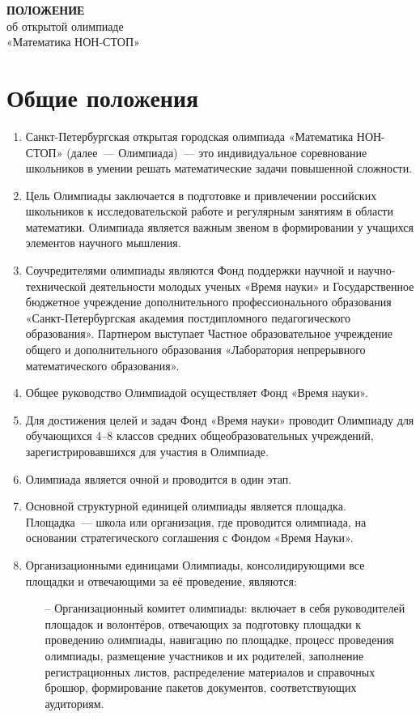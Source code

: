 \documentclass[a4paper,12pt]{article}
\newcommand{\mns}{«Математика НОН-СТОП»\xspace}
\begin{document}


\begin{center} \Large
	{\bf ПОЛОЖЕНИЕ} \\
	об открытой олимпиаде \\
	\mns \\
\end{center}

\section{Общие положения}

\begin{enumerate}
	\item Санкт-Петербургская открытая городская олимпиада «Математика НОН-СТОП» (далее~— Олимпиада)~— это индивидуальное соревнование школьников в умении решать математические задачи повышенной сложности.
	\item Цель Олимпиады заключается в подготовке и привлечении российских школьников к исследовательской работе и регулярным занятиям в области математики. Олимпиада является важным звеном в формировании у учащихся элементов научного мышления.
	\item Соучредителями олимпиады являются Фонд поддержки научной и научно-технической деятельности молодых ученых «Время науки» и Государственное бюджетное учреждение дополнительного профессионального образования «Санкт-Петербургская академия постдипломного педагогического образования». Партнером выступает Частное образовательное учреждение общего и дополнительного образования «Лаборатория непрерывного математического образования».
	\item Общее руководство Олимпиадой осуществляет Фонд «Время науки». 
	\item Для достижения целей и задач Фонд «Время науки» проводит Олимпиаду для обучающихся 4–8 классов средних общеобразовательных учреждений, зарегистрировавшихся для участия в Олимпиаде.
	\item Олимпиада является очной и проводится в один этап.
	\item Основной структурной единицей олимпиады является площадка. Площадка~— школа или организация, где проводится олимпиада, на основании стратегического соглашения с Фондом «Время Науки».
	\item Организационными единицами Олимпиады, консолидирующими все площадки и отвечающими за её проведение, являются: \begin{enumerate}
	   \item[–] Организационный комитет олимпиады: включает в себя руководителей площадок и волонтёров, отвечающих за подготовку площадки к проведению олимпиады, навигацию по площадке, процесс проведения олимпиады, размещение участников и их родителей, заполнение регистрационных листов, распределение материалов и справочных брошюр, формирование пакетов документов, соответствующих аудиториям.

\end{enumerate}
\end{enumerate}
\end{document}
